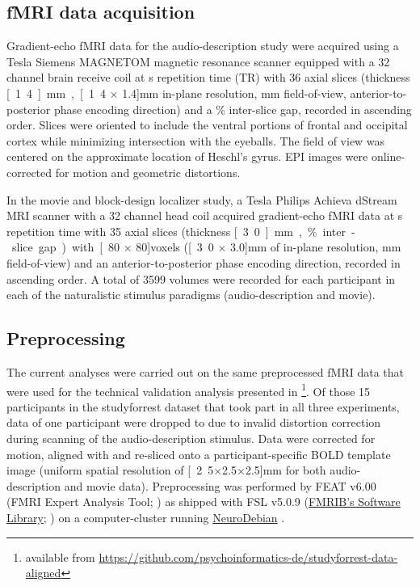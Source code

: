 \documentclass[english]{article}
\begin{document}
\subsection{fMRI data acquisition}

Gradient-echo fMRI data for the audio-description study were acquired using a
\unit[7]{Tesla} Siemens MAGNETOM magnetic resonance scanner equipped with a 32
channel brain receive coil at \unit[2]{s} repetition time (TR) with 36 axial
slices (thickness \unit[1.4]{mm}, \unit[1.4 $\times$ 1.4]{mm} in-plane
resolution, \unit[224]{mm} field-of-view, anterior-to-posterior phase encoding
direction) and a \unit[10]{\%} inter-slice gap, recorded in ascending order.
Slices were oriented to include the ventral portions of frontal and occipital
cortex while minimizing intersection with the eyeballs.
The field of view was centered on the approximate location of Heschl's gyrus.
EPI images were online-corrected for motion and geometric distortions.

In the movie and block-design localizer study, a \unit[3]{Tesla} Philips Achieva dStream
MRI scanner with a 32 channel head coil acquired gradient-echo fMRI data
at \unit[2]{s} repetition time with
35 axial slices (thickness \unit[3.0]{mm}, \unit[10]{\%} inter-slice gap) with
\unit[80 $\times$ 80]{voxels} (\unit[3.0 $\times$ 3.0]{mm} of in-plane
resolution, \unit[240]{mm} field-of-view) and an anterior-to-posterior phase
encoding direction, recorded in ascending order.
A total of 3599 volumes were recorded for each participant in each of the
naturalistic stimulus paradigms (audio-description and movie).

\subsection{Preprocessing}

The current analyses were carried out on the same preprocessed fMRI data that were used
for the technical validation analysis presented in \cite{hanke2016simultaneous}\footnote{available from \url{https://github.com/psychoinformatics-de/studyforrest-data-aligned}}.
Of those 15 participants in the studyforrest dataset that took
part in all three experiments,
data of one participant were dropped to due to invalid distortion correction
during scanning of the audio-description stimulus.
Data were corrected for motion, aligned with and re-sliced onto a
participant-specific BOLD template image \citep{sengupta2016extension}
(uniform spatial resolution of \unit[2.5$\times$2.5$\times$2.5]{mm} for both
audio-description and movie data).
Preprocessing was performed by FEAT v6.00 (FMRI Expert Analysis Tool;
\citep{woolrich2001autocorr}) as shipped with
FSL v5.0.9 (\href{https://www.fmrib.ox.ac.uk/fsl}{FMRIB's Software Library};
\citep{smith2004fsl}) on a computer-cluster running
\href{http://neuro.debian.net}{NeuroDebian} \citep{halchenko2012open}.
\end{document}
